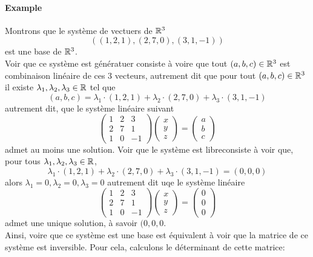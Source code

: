 \paragraph{Example} Montrons que le système de vectuers de $\mathbb{R}^3$ 
$$\left( (1, 2, 1), (2, 7, 0), (3, 1, -1) \right)$$
est une base de $\mathbb{R}^3$. \\
Voir que ce système est génératuer consiste à voire que tout $(a, b, c) \in \mathbb{R}^3$ est combinaison linéaire de ces 3 vecteurs, autrement dit que pour tout $(a, b, c) \in \mathbb{R}^3$ il existe $\lambda_1, \lambda_2, \lambda_3 \in \mathbb{R}$ tel que 
$$(a, b, c) = \lambda_1 \cdot (1, 2, 1) +\lambda_2 \cdot (2, 7, 0) + \lambda_3 \cdot (3, 1, -1)$$
autrement dit, que le système linéaire suivant
$$\begin{pmatrix}
  1 & 2 & 3 \\
  2 & 7 & 1 \\
  1 & 0 & -1
\end{pmatrix}
\begin{pmatrix}
  x \\
  y \\
  z 
\end{pmatrix}
=
\begin{pmatrix}
  a \\
  b \\
  c
\end{pmatrix}$$
admet au moins une solution. Voir que le système est libreconsiste à voir que, pour tous $\lambda_1, \lambda_2, \lambda_3 \in \mathbb{R}$, 
$$\lambda_1 \cdot (1, 2, 1) +\lambda_2 \cdot (2, 7, 0) + \lambda_3 \cdot (3, 1, -1) = (0, 0, 0)$$
alors $\lambda_1=0, \lambda_2=0, \lambda_3=0$ autrement dit uqe le système linéaire
$$\begin{pmatrix}
  1 & 2 & 3 \\
  2 & 7 & 1 \\
  1 & 0 & -1
\end{pmatrix}
\begin{pmatrix}
  x \\
  y \\
  z 
\end{pmatrix}
=
\begin{pmatrix}
  0 \\
  0 \\
  0
\end{pmatrix}$$
admet une unique solution, à savoir $(0, 0, 0$. \\
Ainsi, voire que ce système est une base est équivalent à voir que la matrice de ce système est inversible. Pour cela, calculons le déterminant de cette matrice:
